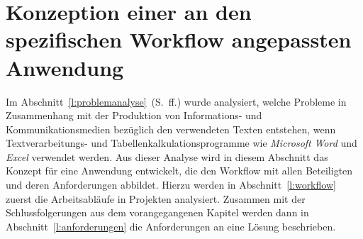 \section{Konzeption einer an den spezifischen Workflow angepassten Anwendung}\label{l:konzeption}

Im Abschnitt~\ref{l:problemanalyse}~(S.\pageref{l:problemanalyse}~ff.) wurde analysiert, welche Probleme in Zusammenhang mit der Produktion von Informations- und Kommunikationsmedien bezüglich den verwendeten Texten entstehen, wenn Textverarbeitungs- und Tabellenkalkulationsprogramme wie \emph{Microsoft} \emph{Word} und \emph{Excel} verwendet werden. Aus dieser Analyse wird in diesem Abschnitt das Konzept für eine Anwendung entwickelt, die den Workflow mit allen Beteiligten und deren Anforderungen abbildet. Hierzu werden in Abschnitt~\ref{l:workflow} zuerst die Arbeitsabläufe in Projekten analysiert. Zusammen mit der Schlussfolgerungen aus dem vorangegangenen Kapitel werden dann in Abschnitt~\ref{l:anforderungen} die Anforderungen an eine Lösung beschrieben. 





